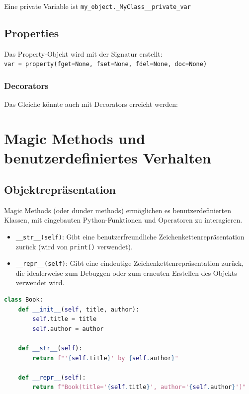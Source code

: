 Eine private Variable ist \texttt{my\_object.\_MyClass\_\_private\_var}

\subsection{Properties}
Das Property-Objekt wird mit der Signatur erstellt: \\
\texttt{var = property(fget=None, fset=None, fdel=None, doc=None)}



\subsubsection{Decorators}

Das Gleiche könnte auch mit Decorators erreicht werden:



\section{Magic Methods und benutzerdefiniertes Verhalten}

\subsection{Objektrepräsentation}
Magic Methods (oder dunder methods) ermöglichen es benutzerdefinierten Klassen, mit eingebauten Python-Funktionen und Operatoren zu interagieren.
\begin{itemize}
    \item \texttt{\_\_str\_\_(self)}: Gibt eine benutzerfreundliche Zeichenkettenrepräsentation zurück (wird von \texttt{print()} verwendet).
    \item \texttt{\_\_repr\_\_(self)}: Gibt eine eindeutige Zeichenkettenrepräsentation zurück, die idealerweise zum Debuggen oder zum erneuten Erstellen des Objekts verwendet wird.
\end{itemize}

\begin{lstlisting}[language=Python]
class Book:
    def __init__(self, title, author):
        self.title = title
        self.author = author

    def __str__(self):
        return f"'{self.title}' by {self.author}"

    def __repr__(self):
        return f"Book(title='{self.title}', author='{self.author}')"
\end{lstlisting}

